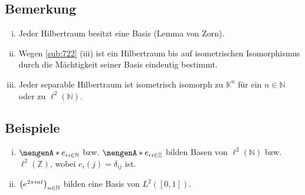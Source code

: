\subsection{Bemerkung} %
\label{sub:723}
\begin{enumerate}[(i)]
	\item Jeder Hilbertraum besitzt eine Basis (Lemma von Zorn).
	\item Wegen \ref{sub:722} (iii) ist ein Hilbertraum bis auf isometrischen Isomorphismus durch die Mächtigkeit seiner Basis eindeutig bestimmt.
	\item Jeder separable Hilbertraum ist isometrisch isomorph zu $\mathds{K}^n$ für ein $n \in \mathds{N}$ oder zu $\ell^2(\mathds{N})$.
\end{enumerate}

\subsection[Beispiele für Basen von Hilberträumen]{Beispiele} %
\label{sub:724}
\begin{enumerate}[(i)]
	\item $\set{e_i}_{i \in \mathds{N}}$ bzw. $\set{e_i}_{i \in \mathds{Z}}$ bilden Basen von $\ell^2(\mathds{N})$ bzw. $\ell^2(\mathds{Z})$, wobei 
	$e_i(j)= \delta_{ij}$ ist.
	\item $\enbrace*{e^{2 \pi i n t}}_{n \in \mathds{N}}$ bilden eine Basis von $L^2([0,1])$.
\end{enumerate}

